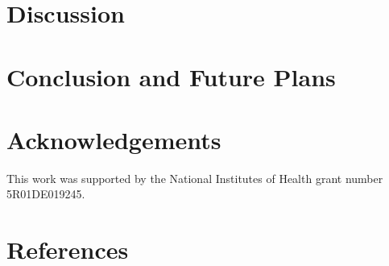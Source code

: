 \documentclass[a4paper,10pt]{article}
\begin{document}
\section{Discussion}

\section{Conclusion and Future Plans}

\section{Acknowledgements}
This work was supported by the National Institutes of Health grant number 5R01DE019245.\\

\section{References}
\end{document}
